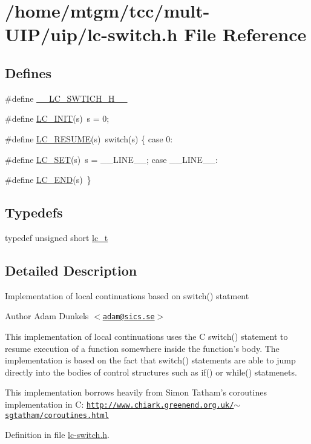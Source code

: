 \hypertarget{lc-switch_8h}{
\section{/home/mtgm/tcc/mult-\/UIP/uip/lc-\/switch.h File Reference}
\label{lc-switch_8h}
}
\subsection*{Defines}
\begin{DoxyCompactItemize}
\item 
\#define \hyperlink{group__lc_ga44311ecc30759ca38b4069182247bdae}{\_\-\_\-LC\_\-SWTICH\_\-H\_\-\_\-}
\item 
\#define \hyperlink{group__lc_ga2c1bb4fa6d7a6ff951a41c73fc721109}{LC\_\-INIT}(s)~s = 0;
\item 
\#define \hyperlink{group__lc_ga1ec8b8f4710dce1fa7fb87d3a31541ae}{LC\_\-RESUME}(s)~switch(s) \{ case 0:
\item 
\#define \hyperlink{group__lc_gad8eec328a4868d767f0c00c8d1c6cfc1}{LC\_\-SET}(s)~s = \_\-\_\-LINE\_\-\_\-; case \_\-\_\-LINE\_\-\_\-:
\item 
\#define \hyperlink{group__lc_gaca51ceb2f5d855dfde55bcedf8d3b92d}{LC\_\-END}(s)~\}
\end{DoxyCompactItemize}
\subsection*{Typedefs}
\begin{DoxyCompactItemize}
\item 
typedef unsigned short \hyperlink{group__lc_ga3983e0c026396d5c4506779d770007ba}{lc\_\-t}
\end{DoxyCompactItemize}


\subsection{Detailed Description}
Implementation of local continuations based on switch() statment \begin{DoxyAuthor}{Author}
Adam Dunkels $<$\href{mailto:adam@sics.se}{\tt adam@sics.se}$>$
\end{DoxyAuthor}
This implementation of local continuations uses the C switch() statement to resume execution of a function somewhere inside the function's body. The implementation is based on the fact that switch() statements are able to jump directly into the bodies of control structures such as if() or while() statmenets.

This implementation borrows heavily from Simon Tatham's coroutines implementation in C: \href{http://www.chiark.greenend.org.uk/~sgtatham/coroutines.html}{\tt http://www.chiark.greenend.org.uk/$\sim$sgtatham/coroutines.html} 

Definition in file \hyperlink{lc-switch_8h_source}{lc-\/switch.h}.

